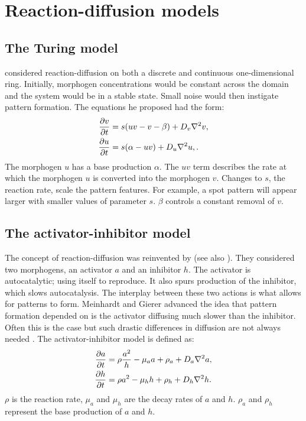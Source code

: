 \section{Reaction-diffusion models}
\subsection{The Turing model}
\citet{turing1952} considered reaction-diffusion on both a discrete and continuous one-dimensional ring. Initially, morphogen concentrations would be constant across the domain and the system would be in a stable state. Small noise would then instigate pattern formation. The equations he proposed had the form:
	\begin{equation}
	\begin{aligned} \label{eq:turingRD}
			\frac{\partial v}{\partial t} &= s(uv-v-\beta) + D_v \nabla^2 v,\\
			\frac{\partial u}{\partial t} &= s(\alpha-uv) + D_u \nabla^2 u,.
	\end{aligned}
	\end{equation}
The morphogen $u$ has a base production $\alpha$. The $uv$ term describes the rate at which the morphogen $u$ is converted into the morphogen $v$. Changes to $s$, the reaction rate, scale the pattern features. For example, a spot pattern will appear larger with smaller values of parameter $s$. $\beta$ controls a constant removal of $v$.

\subsection{The activator-inhibitor model}
The concept of reaction-diffusion was reinvented by \citet{gierer1972} (see also \citep{meinhardt1982}). They considered two morphogens, an activator $a$ and an inhibitor $h$. The activator is autocatalytic; using itself to reproduce. It also spurs production of the inhibitor, which slows autocatalysis. The interplay between these two actions is what allows for patterns to form. Meinhardt and Gierer advanced the idea that pattern formation depended on is the activator diffusing much slower than the inhibitor. Often this is the case but such drastic differences in diffusion are not always needed \citep{gray1984, marcon2016}. The activator-inhibitor model is defined as:
	\begin{equation}
	\begin{aligned} \label{eq:activatorInhibitorRD}
			\frac{\partial a}{\partial t} &= \rho \frac{a^2}{h} - \mu_a a + \rho_a + D_a \nabla^2 a,\\
			\frac{\partial h}{\partial t} &= \rho a^2 - \mu_h h  + \rho_h + D_h \nabla^2 h.
	\end{aligned}
	\end{equation}
$\rho$ is the reaction rate, $\mu_a$ and $\mu_h$ are the decay rates of $a$ and $h$. $\rho_a$ and $\rho_h$ represent the base production of $a$ and $h$. 

